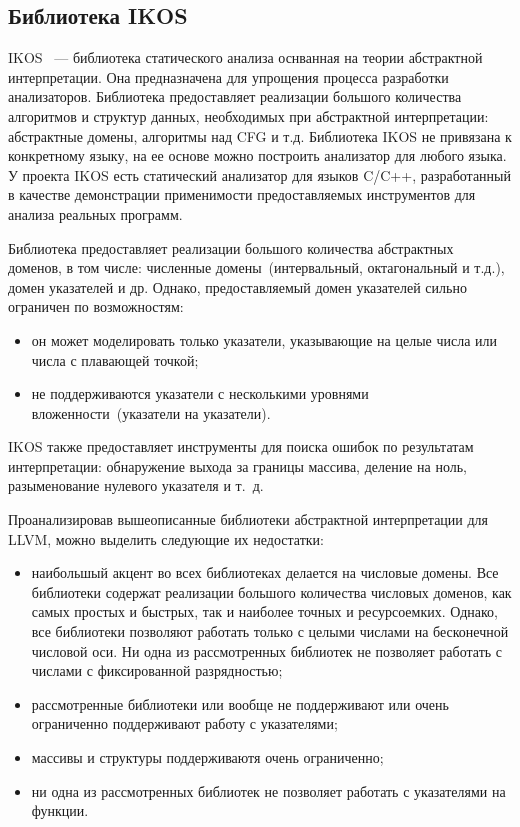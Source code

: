 \subsection{Библиотека IKOS}
IKOS~\cite{ikos} --- библиотека статического анализа оснванная на теории 
абстрактной интерпретации. Она предназначена для упрощения процесса разработки 
анализаторов. Библиотека предоставляет реализации большого количества 
алгоритмов и структур данных, необходимых при абстрактной интерпретации: 
абстрактные домены, алгоритмы над CFG и т.д. Библиотека IKOS не привязана к
конкретному языку, на ее основе можно построить анализатор для любого языка.
У проекта IKOS есть статический анализатор для языков C/C++, разработанный
в качестве демонстрации применимости предоставляемых инструментов для анализа
реальных программ.

Библиотека предоставляет реализации большого количества абстрактных доменов, в
том числе: численные домены~(интервальный, октагональный и т.д.), домен 
указателей и др. Однако, предоставляемый домен указателей сильно ограничен
по возможностям:
\begin{itemize}
\item он может моделировать только указатели, указывающие на целые числа или
числа с плавающей точкой;
\item не поддерживаются указатели с несколькими уровнями вложенности~(указатели
на указатели).
\end{itemize}

IKOS также предоставляет инструменты для поиска ошибок по результатам 
интерпретации: обнаружение выхода за границы массива, деление на ноль,
разыменование нулевого указателя и т.~д.

Проанализировав вышеописанные библиотеки абстрактной интерпретации для LLVM,
можно выделить следующие их недостатки:
\begin{itemize}
\item наибольшый акцент во всех библиотеках делается на числовые домены. Все 
библиотеки содержат реализации большого количества числовых доменов, как самых
простых и быстрых, так и наиболее точных и ресурсоемких. Однако, все 
библиотеки позволяют работать только с целыми числами на бесконечной числовой
оси. Ни одна из рассмотренных библиотек не позволяет работать с числами с 
фиксированной разрядностью;
\item рассмотренные библиотеки или вообще не поддерживают или очень ограниченно
поддерживают работу с указателями;
\item массивы и структуры поддерживаютя очень ограниченно;
\item ни одна из рассмотренных библиотек не позволяет работать с указателями на функции.
\end{itemize}


